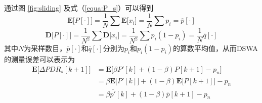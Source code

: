 通过图 \ref{fig:sliding} 及式（\ref{equa:P_s}）可以得到
\begin{equation}
  \textbf{E[}P[\cdot]\textbf{]}=\frac{1}{N}\sum\textbf{E[}x_i\textbf{]}=\frac{1}{N}\sum{p_i}=\overline{p}[\cdot]
\label{equa:epinter}
\end{equation}
\begin{equation}
  \textbf{D[}P[\cdot]\textbf{]}=\frac{1}{N^2}\sum\textbf{D[}x_i\textbf{]}=\frac{1}{N^2}\sum{p_i(1-p_i)}=\frac{1}{N}\overline{q}[\cdot]
\label{equa:dpinter}
\end{equation}
其中$N$为采样数目，$\overline{p}[\cdot]$和$\overline{q}[\cdot]$分别为$p_i$和$p_i(1-p_i)$的算数平均值，从而DSWA的测量误差可以表示为
%
\begin{equation}
\begin{split}
 \textbf{E[}\Delta PDR_s[k+1]\textbf{]}&=\textbf{E[}\beta P'[k]+(1-\beta)P[k+1]-p_{n}\textbf{]}\\
                                       &=\beta\textbf{E[}P'[k]\textbf{]}+(1-\beta)\textbf{E[}P[k+1]\textbf{]}-p_{n}\\
                                       &=\beta\overline{p'}[k]+(1-\beta)\overline{p}[k+1]-p_{n}
\end{split}
\label{equa:Eps}
\end{equation}

